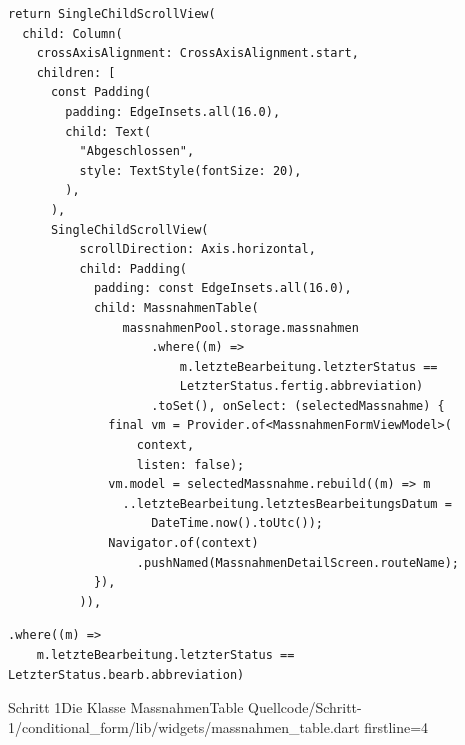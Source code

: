 \begin{listing}[htbp]
  \begin{verbatim}
return SingleChildScrollView(
  child: Column(
    crossAxisAlignment: CrossAxisAlignment.start,
    children: [
      const Padding(
        padding: EdgeInsets.all(16.0),
        child: Text(
          "Abgeschlossen",
          style: TextStyle(fontSize: 20),
        ),
      ),
      SingleChildScrollView(
          scrollDirection: Axis.horizontal,
          child: Padding(
            padding: const EdgeInsets.all(16.0),
            child: MassnahmenTable(
                massnahmenPool.storage.massnahmen
                    .where((m) =>
                        m.letzteBearbeitung.letzterStatus ==
                        LetzterStatus.fertig.abbreviation)
                    .toSet(), onSelect: (selectedMassnahme) {
              final vm = Provider.of<MassnahmenFormViewModel>(
                  context,
                  listen: false);
              vm.model = selectedMassnahme.rebuild((m) => m
                ..letzteBearbeitung.letztesBearbeitungsDatum =
                    DateTime.now().toUtc());
              Navigator.of(context)
                  .pushNamed(MassnahmenDetailScreen.routeName);
            }),
          )),
        \end{verbatim}
  \caption[Schritt 1 Ausgabe der finalen Maßnahmen]{Die Ausgabe der finalen Maßnahmen, Quelle: Eigenes Listing, \newline Datei: Quellcode/Schritt-1/conditional_form/lib/screens/massnahmen_master.dart}

  \label{lst:Schritt1AusgabeDerFinalenMaßnahmen}
\end{listing}


\begin{listing}[htbp]
  \begin{verbatim}
.where((m) =>
    m.letzteBearbeitung.letzterStatus == LetzterStatus.bearb.abbreviation)
\end{verbatim}
  \caption[Schritt 1 Bedingung der Entwurf-Maßnahmen]{Die Bedingung der Entwurf-Maßnahmen, Quelle: Eigenes Listing, \newline Datei: Quellcode/Schritt-1/conditional_form/lib/screens/massnahmen_master.dart}
  \label{lst:Schritt1BedingungDerEntwurfMaßnahmen}
\end{listing}

\begin{alexlistingzwei}{Schritt 1}{Die Klasse MassnahmenTable}
  {Quellcode/Schritt-1/conditional_form/lib/widgets/massnahmen_table.dart}
  {firstline=4}
  \label{lst:Schritt1KlasseMassnahmenTable}
\end{alexlistingzwei}





